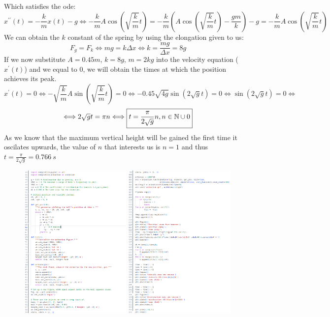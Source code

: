\documentclass{report}
\begin{document}
  \noindent Which satisfies the ode:
  \[x^{\prime\prime}(t)=-\dfrac{k}{m}x(t)-g\Longleftrightarrow -\dfrac{k}{m}A\cos\left(\sqrt{\dfrac{k}{m}} t\right)=-\dfrac{k}{m}\left(A\cos\left(\sqrt{\dfrac{k}{m}} t\right)-\dfrac{gm}{k}\right)-g=-\dfrac{k}{m}A\cos\left(\sqrt{\dfrac{k}{m}}t\right)\]
  \noindent We can obtain the $k$ constant of the spring by using the elongation given to us:
  \[F_g=F_k\Longleftrightarrow mg=k\Delta x\Longleftrightarrow k=\dfrac{mg}{\Delta x}=8g\]
  \noindent If we now substitute $A=0.45m$, $k=8g$, $m=2kg$ into the velocity equation ($x^\prime(t)$) and we equal to $0$, we will obtain the times at which the position achieves its peak.
  \[x^\prime(t)=0\Longleftrightarrow-\sqrt{\dfrac{k}{m}}A\sin\left(\sqrt{\dfrac{k}{m}} t\right)=0\Longleftrightarrow-0.45\sqrt{4g}\sin\left(2\sqrt{g}t\right)=0\Longleftrightarrow \sin(2\sqrt{g}t)=0 \Longleftrightarrow \]
  \[\Longleftrightarrow 2\sqrt{g}t=\pi n \Longleftrightarrow \boxed{t=\dfrac{\pi}{2\sqrt{g}}n, n\in\mathbb{N}\cup 0}\]
  \noindent As we know that the maximum vertical height will be gained the first time it oscilates upwards, the value of $n$ that interests us is $n=1$ and thus $t=\frac{\pi}{2\sqrt{g}}=0.766\ s$
\clearpage
\begin{figure}
  \centering
  \includegraphics[width=0.49\textwidth]{fotos/code1.png}
  \includegraphics[width=0.49\textwidth]{fotos/code2.png}
\end{figure}
\end{document}
